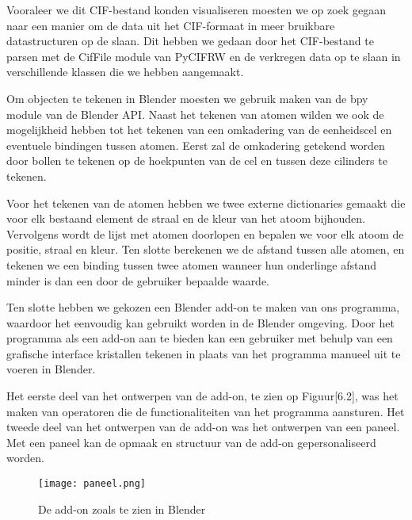 \par
Vooraleer we dit CIF-bestand konden visualiseren moesten we op zoek gegaan naar een manier om de data uit het CIF-formaat in meer bruikbare datastructuren op de slaan. Dit hebben we gedaan door het CIF-bestand te parsen met de CifFile module van PyCIFRW en de verkregen data op te slaan in verschillende klassen die we hebben aangemaakt. 
\par
Om objecten te tekenen in Blender moesten we gebruik maken van de bpy module van de Blender API. Naast het tekenen van atomen wilden we ook de mogelijkheid hebben tot het tekenen van een omkadering van de eenheidscel en eventuele bindingen tussen atomen. Eerst zal de omkadering getekend worden door bollen te tekenen op de hoekpunten van de cel en tussen deze cilinders te tekenen. 
\par
Voor het tekenen van de atomen hebben we twee externe dictionaries gemaakt die voor elk bestaand element de straal en de kleur van het atoom bijhouden. Vervolgens wordt de lijst met atomen doorlopen en bepalen we voor elk atoom de positie, straal en kleur. Ten slotte berekenen we de afstand tussen alle atomen, en tekenen we een binding tussen twee atomen wanneer hun onderlinge afstand minder is dan een door de gebruiker bepaalde waarde. 
\par
Ten slotte hebben we gekozen een Blender add-on te maken van ons programma, waardoor het eenvoudig kan gebruikt worden in de Blender omgeving. Door het programma als een add-on aan te bieden kan een gebruiker met behulp van een grafische interface kristallen tekenen in plaats van het programma manueel uit te voeren in Blender. 
\par
Het eerste deel van het ontwerpen van de add-on, te zien op Figuur[6.2], was het maken van operatoren die de functionaliteiten van het programma aansturen. Het tweede deel van het ontwerpen van de add-on was het ontwerpen van een paneel. Met een paneel kan de opmaak en structuur van de add-on gepersonaliseerd worden. 
\par  
\begin{figure}[H]
\begin{center}
\texttt{[image: paneel.png]}
\end{center}
\caption{De add-on zoals te zien in Blender}
\end{figure}

